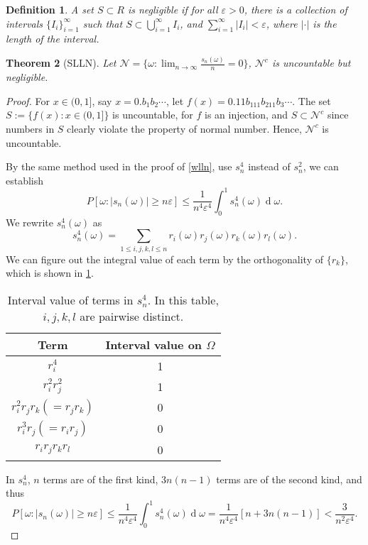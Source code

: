 \documentclass[12pt]{article}
\newtheorem{theorem}{Theorem}
\newtheorem{definition}[theorem]{Definition}
\newcommand\nn{\mathcal{N}}
\newcommand\eps{\varepsilon}
\DeclareMathOperator{\diff}{d}
\begin{document}
\begin{definition}
    A set $S \subset R$ is negligible if 
    for all $\eps > 0$, there is a collection of intervals
    $\{I_i\}_{i=1}^{\infty}$ such that $S \subset \bigcup_{i = 1}^{\infty} I_i$,
    and $\sum_{i=1}^\infty |I_i| < \eps$,
    where $|\cdot|$ is the length of the interval.
\end{definition}
\begin{theorem}[SLLN]
   Let $\nn = \{\omega : \lim_{n \to \infty} \frac{s_n(\omega)}{n} = 0\}$,
   $\nn^c$ is uncountable but negligible.
\end{theorem}
\begin{proof}
    For $x \in (0,1]$, say $x = 0.b_1b_2\cdots$, 
    let $f(x) = 0.11b_111b_211b_3\cdots.$ The set 
    $S := \{f(x) : x\in(0,1]\}$ is uncountable, for $f$
    is an injection, and $S \subset \nn^c$ since numbers in $S$
    clearly violate the property of normal number. Hence, 
    $\nn^c$ is uncountable.

    By the same method used in the proof of \cref{wlln}, use $s_n^4$ instead of $s_n^2$,
    we can establish 
    \begin{equation} 
        P[\omega : |s_n(\omega)| \ge n\eps]
        \leq \frac{1}{n^4\eps^4} \int_0^1 s_n^4(\omega) \diff \omega. 
    \end{equation}
    We rewrite $s_n^4(\omega)$ as 
    \begin{equation}
        s_n^4(\omega) = \sum_{1 \leq i,j,k,l \leq n} 
        r_i(\omega)  r_j(\omega) r_k(\omega)  r_l(\omega). 
    \end{equation}
    We can figure out the integral value of each term 
    by the orthogonality of $\{r_k\}$, which is 
    shown in \cref{table}.
    \begin{table}[h]
        \centering
        \begin{tabular}{c|c}
            \toprule
                Term & Interval value on $\Omega$\\
            \midrule
                $r_i^4$ & 1 \\
                $r_i^2r_j^2$ & 1\\
                $r_i^2r_jr_k (= r_jr_k)$ & 0 \\
                $r_i^3r_j ( = r_ir_j)$ & 0 \\
                $r_ir_jr_kr_l$   & 0  \\
            \bottomrule
        \end{tabular}
        \caption{Interval value of terms in $s_n^4$.  In this table, $i,j,k,l$ are pairwise distinct.}
        \label{table}
    \end{table}
    In $s_n^4$, $n$ terms are of the first kind, 
    $3n(n-1)$ terms are of the second kind, and thus 
    \begin{equation} \label{main}
        P[\omega : |s_n(\omega)| \ge n\eps] \leq  
        \frac{1}{n^4\eps^4} \int_0^1 s_n^4(\omega) \diff \omega 
        =\frac{1}{n^4\eps^4} [n + 3n(n-1)] < \frac{3}{n^2\eps{^4}}.
    \end{equation}


\end{proof}
\end{document}
